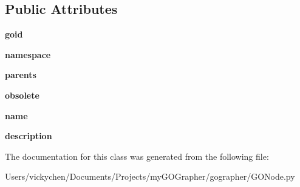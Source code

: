 \subsection*{Public Attributes}
\begin{DoxyCompactItemize}
\item 
\hypertarget{class_g_o_node_1_1_g_o_node_a419738231e6061c8f35c7038600045b5}{
{\bfseries goid}}
\label{class_g_o_node_1_1_g_o_node_a419738231e6061c8f35c7038600045b5}

\item 
\hypertarget{class_g_o_node_1_1_g_o_node_a14d769d661d7dad68b451d0ee40dc7c8}{
{\bfseries namespace}}
\label{class_g_o_node_1_1_g_o_node_a14d769d661d7dad68b451d0ee40dc7c8}

\item 
\hypertarget{class_g_o_node_1_1_g_o_node_a0e5b6b8b5e9b4a88ff0752017d90f544}{
{\bfseries parents}}
\label{class_g_o_node_1_1_g_o_node_a0e5b6b8b5e9b4a88ff0752017d90f544}

\item 
\hypertarget{class_g_o_node_1_1_g_o_node_a21c9f4840075c55ca91a59d4e7907f1f}{
{\bfseries obsolete}}
\label{class_g_o_node_1_1_g_o_node_a21c9f4840075c55ca91a59d4e7907f1f}

\item 
\hypertarget{class_g_o_node_1_1_g_o_node_a18b00948dd27ef1af426a1b8a522467d}{
{\bfseries name}}
\label{class_g_o_node_1_1_g_o_node_a18b00948dd27ef1af426a1b8a522467d}

\item 
\hypertarget{class_g_o_node_1_1_g_o_node_ad22366488d580d7aa91527f0b592d64d}{
{\bfseries description}}
\label{class_g_o_node_1_1_g_o_node_ad22366488d580d7aa91527f0b592d64d}

\end{DoxyCompactItemize}


The documentation for this class was generated from the following file:\begin{DoxyCompactItemize}
\item 
Users/vickychen/Documents/Projects/myGOGrapher/gographer/GONode.py\end{DoxyCompactItemize}
